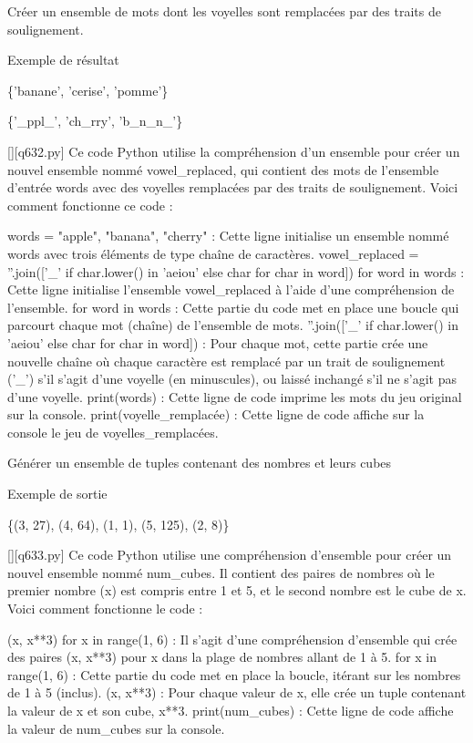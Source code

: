        \question
        Créer un ensemble de mots dont les voyelles sont remplacées par des traits de soulignement.

Exemple de résultat

\{'banane', 'cerise', 'pomme'\}

\{'\_ppl\_', 'ch\_rry', 'b\_n\_n\_'\}
        \par
        \begin{solution}
            \renewcommand{\nomfichier}{q632.py}
            \pythonfile{\chemincode \nomfichier}[][\nomfichier]
            Ce code Python utilise la compréhension d'un ensemble pour créer un nouvel ensemble nommé vowel_replaced, qui contient des mots de l'ensemble d'entrée words avec des voyelles remplacées par des traits de soulignement. Voici comment fonctionne ce code :

    words = {"apple", "banana", "cherry"} : Cette ligne initialise un ensemble nommé words avec trois éléments de type chaîne de caractères.
    vowel_replaced = {''.join(['_' if char.lower() in 'aeiou' else char for char in word]) for word in words} : Cette ligne initialise l'ensemble vowel_replaced à l'aide d'une compréhension de l'ensemble.
        for word in words : Cette partie du code met en place une boucle qui parcourt chaque mot (chaîne) de l'ensemble de mots.
        ''.join(['_' if char.lower() in 'aeiou' else char for char in word]) : Pour chaque mot, cette partie crée une nouvelle chaîne où chaque caractère est remplacé par un trait de soulignement ('_') s'il s'agit d'une voyelle (en minuscules), ou laissé inchangé s'il ne s'agit pas d'une voyelle.
    print(words) : Cette ligne de code imprime les mots du jeu original sur la console.
    print(voyelle_remplacée) : Cette ligne de code affiche sur la console le jeu de voyelles_remplacées.
        \end{solution}
        

        \question
        Générer un ensemble de tuples contenant des nombres et leurs cubes

Exemple de sortie

\{(3, 27), (4, 64), (1, 1), (5, 125), (2, 8)\}
        \par
        \begin{solution}
            \renewcommand{\nomfichier}{q633.py}
            \pythonfile{\chemincode \nomfichier}[][\nomfichier]
            Ce code Python utilise une compréhension d'ensemble pour créer un nouvel ensemble nommé num_cubes. Il contient des paires de nombres où le premier nombre (x) est compris entre 1 et 5, et le second nombre est le cube de x. Voici comment fonctionne le code :

    {(x, x**3) for x in range(1, 6)} : Il s'agit d'une compréhension d'ensemble qui crée des paires (x, x**3) pour x dans la plage de nombres allant de 1 à 5.
        for x in range(1, 6) : Cette partie du code met en place la boucle, itérant sur les nombres de 1 à 5 (inclus).
        (x, x**3) : Pour chaque valeur de x, elle crée un tuple contenant la valeur de x et son cube, x**3.
    print(num_cubes) : Cette ligne de code affiche la valeur de num_cubes sur la console.
        \end{solution}
        

